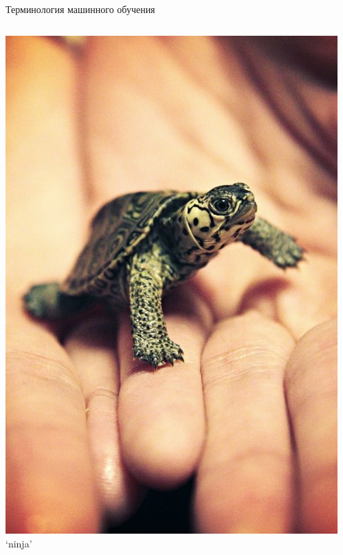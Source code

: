 \documentclass[aspectratio=169, professionalfonts]{beamer}
\begin{document}
\begin{frame}{Терминология машинного обучения}
\begin{columns}
\begin{column}{.1\linewidth}
            \includegraphics[width=\linewidth]{graphs/fig17_7.jpg}
            `ninja'
        \end{column}
        \begin{column}{.1\linewidth}
            \centering

\end{column}
\end{columns}
\end{frame}
\end{document}

